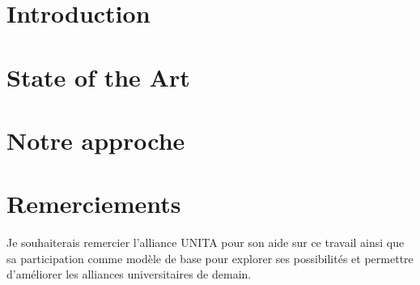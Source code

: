 \documentclass{cnriut} %
\begin{document}
\creationEnTete        %

\section{Introduction}


\section{State of the Art}


\section{Notre approche}


\section{Remerciements}
Je souhaiterais remercier l'alliance UNITA pour son aide sur ce travail ainsi que sa participation comme modèle de base pour explorer ses possibilités et permettre d'améliorer les alliances universitaires de demain.

\printbibliography
\end{document}
